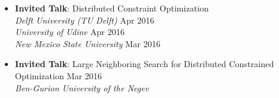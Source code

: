 \begin{itemize}
	\item {\bf Invited Talk}: Distributed Constraint Optimization\\
	{\em Delft University (TU Delft)} \hfill {Apr 2016}\\
 	{\em University of Udine} \hfill {Apr 2016} \\ 
	{\em New Mexico State University} \hfill {Mar 2016}
	
	\item {\bf Invited Talk}: Large Neighboring Search for Distributed Constrained Optimization \hfill {Mar 2016}\\
	{\em Ben-Gurion University of the Negev}
\end{itemize}
